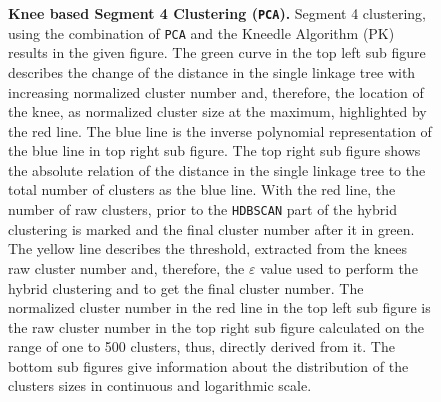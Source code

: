 \begin{figure}[!hbt]
\begin{subfigure}[b]{0.475\textwidth}
    \end{subfigure}
    \caption[Knee based Segment 4 Clustering (\texttt{PCA})]{\textbf{Knee based Segment 4 Clustering (\texttt{PCA}).} Segment 4 clustering, using the combination of \texttt{PCA} and the Kneedle Algorithm (PK) results in the given figure. The green curve in the top left sub figure describes the change of the distance in the single linkage tree with increasing normalized cluster number and, therefore, the location of the knee, as normalized cluster size at the maximum, highlighted by the red line. The blue line is the inverse polynomial representation of the blue line in top right sub figure. The top right sub figure shows the absolute relation of the distance in the single linkage tree to the total number of clusters as the blue line. With the red line, the number of raw clusters, prior to the \texttt{HDBSCAN} part of the hybrid clustering is marked and the final cluster number after it in green. The yellow line describes the threshold, extracted from the knees raw cluster number and, therefore, the $\varepsilon$ value used to perform the hybrid clustering and to get the final cluster number. The normalized cluster number in the red line in the top left sub figure is the raw cluster number in the top right sub figure calculated on the range of one to 500 clusters, thus, directly derived from it. The bottom sub figures give information about the distribution of the clusters sizes in continuous and logarithmic scale.}
    \label{fig:PCA_Cluster_Knee_4}
\end{figure}

